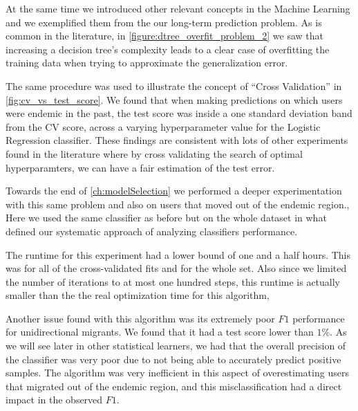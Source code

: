 At the same time we introduced other relevant concepts in the Machine Learning and we exemplified them from the our long-term prediction problem.
As is common in the literature, in \cref{figure:dtree_overfit_problem_2} we saw that increasing a decision tree's complexity leads to a clear case of overfitting the training data when trying to approximate the generalization error.

The same procedure was used to illustrate the concept of ``Cross Validation'' in \cref{fig:cv_vs_test_score}.
We found that when making predictions on which users were endemic in the past, the test score was inside a one standard deviation band from the CV score, across a varying hyperparameter value for the Logistic Regression classifier.
These findings are consistent with lots of other experiments found in the literature where by cross validating the search of optimal hyperparamters, we can have a fair estimation of the test error.


Towards the end of \cref{ch:modelSelection} we performed a deeper experimentation with this same problem and also on users that moved out of the endemic region.,
Here we used the same classifier as before but on the whole dataset in what defined our systematic approach of analyzing classifiers performance.


The runtime for this experiment had a lower bound of one and a half hours.
This was for all of the cross-validated fits and for the whole set.
Also since we limited the number of iterations to at most one hundred steps, this runtime is actually smaller than the the real optimization time for this algorithm,

Another issue found with this algorithm was its extremely poor $F1$ performance for unidirectional migrants.
We found that it had a test score lower than $1\%$.
As we will see later in other statistical learners, we had that
the overall precision of the classifier was very poor due to not being able to accurately predict positive samples.
The algorithm was very inefficient in this aspect of overestimating users that migrated out of the endemic region, and this misclassification had a direct impact in the observed $F1$.


